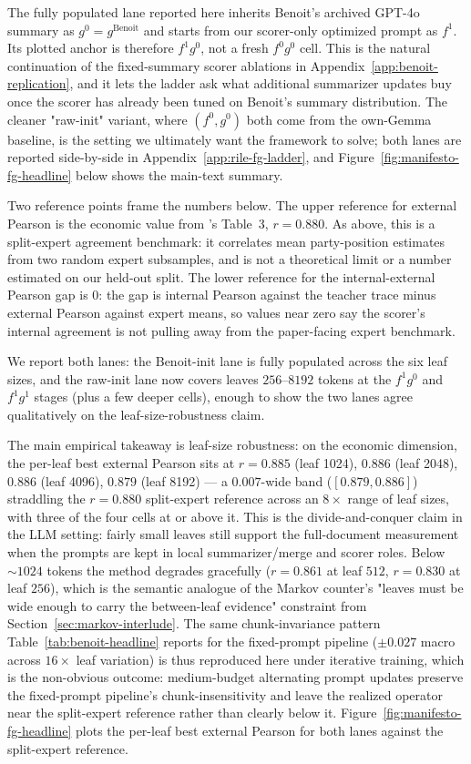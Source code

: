 The fully populated lane reported here inherits Benoit's archived
GPT-4o summary as $g^0 = g^{\mathrm{Benoit}}$ and starts from our
scorer-only optimized prompt as $f^1$. Its plotted anchor is therefore
$f^1 g^0$, not a fresh $f^0 g^0$ cell. This is the natural continuation
of the fixed-summary scorer ablations in Appendix~\ref{app:benoit-replication},
and it lets the ladder ask what additional summarizer updates buy once
the scorer has already been tuned on Benoit's summary distribution. The
cleaner "raw-init" variant, where $(f^0, g^0)$ both come from the
own-Gemma baseline, is the setting we ultimately want the framework to
solve; both lanes are reported side-by-side in
Appendix~\ref{app:rile-fg-ladder}, and
Figure~\ref{fig:manifesto-fg-headline} below shows the main-text summary.

Two reference points frame the numbers below. The upper reference for
external Pearson is the economic value from \citet{BenoitEtAl2025}'s
Table~3, $r = 0.880$. As above, this is a split-expert agreement
benchmark: it correlates mean party-position estimates from two random
expert subsamples, and is not a theoretical limit or a number
estimated on our held-out split. The lower reference for the
internal-external Pearson gap is $0$: the gap is internal Pearson
against the teacher trace minus external Pearson against expert means,
so values near zero say the scorer's internal agreement is not pulling
away from the paper-facing expert benchmark.

We report both lanes: the Benoit-init lane is fully populated across
the six leaf sizes, and the raw-init lane now covers leaves
$256$--$8192$ tokens at the $f^1 g^0$ and $f^1 g^1$ stages (plus a few
deeper cells), enough to show the two lanes agree qualitatively on
the leaf-size-robustness claim.

The main empirical takeaway is leaf-size robustness: on the economic
dimension, the per-leaf best external Pearson sits at $r = 0.885$
(leaf 1024), $0.886$ (leaf 2048), $0.886$ (leaf 4096), $0.879$ (leaf
8192) --- a $0.007$-wide band ($[0.879, 0.886]$) straddling the
$r = 0.880$ split-expert reference across an $8\times$ range of
leaf sizes, with three of the four cells at or above it. This is the
divide-and-conquer claim in the LLM setting: fairly small leaves still
support the full-document measurement when the prompts are kept in
local summarizer/merge and scorer roles.
Below $\sim 1024$ tokens the method degrades gracefully
($r = 0.861$ at leaf $512$, $r = 0.830$ at leaf $256$), which is the
semantic analogue of the Markov counter's "leaves must be wide enough
to carry the between-leaf evidence" constraint from
Section~\ref{sec:markov-interlude}. The same chunk-invariance pattern
Table~\ref{tab:benoit-headline} reports for the fixed-prompt pipeline
($\pm 0.027$ macro across $16\times$ leaf variation) is thus
reproduced here under iterative training, which is the non-obvious
outcome: medium-budget alternating prompt updates preserve the
fixed-prompt pipeline's chunk-insensitivity and leave the realized
operator near the split-expert reference rather than clearly below it.
Figure~\ref{fig:manifesto-fg-headline} plots the per-leaf best external
Pearson for both lanes against the split-expert reference.

